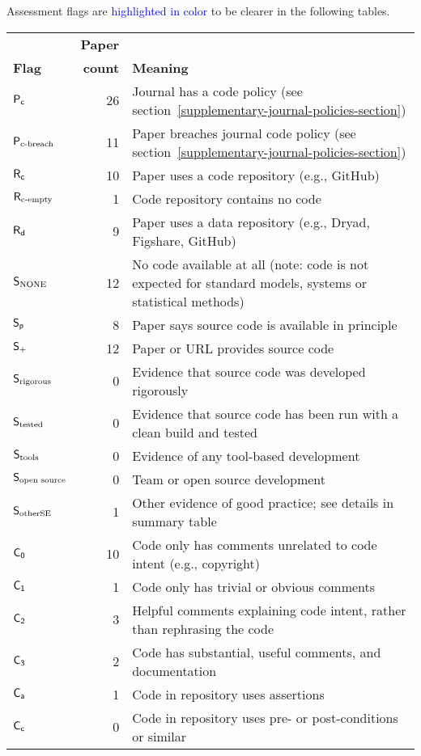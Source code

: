 \documentclass[10pt,a4paper]{article}
\begin{document}
\def\flagStyle#1{\textcolor{blue}{\sf #1}}

\noindent
Assessment flags are \flagStyle{highlighted in color} to be clearer in the following tables.\\

\noindent
\begin{center}
\sf
\begin{tabular}{lrp{4.5in}}
&\bfseries{Paper}&\\\bfseries{Flag}&\bfseries{count}&\bfseries{Meaning}\\ \hline 
\flagStyle{$\sf P_c$}&26&Journal has a code policy (see section~\ref{supplementary-journal-policies-section})\\ 
\flagStyle{$\sf P_{{\mbox{\scriptsize c-breach}}}$}&11&Paper breaches journal code policy (see section~\ref{supplementary-journal-policies-section})\\ 
\flagStyle{$\sf R_c$}&10&Paper uses a code repository (e.g., GitHub)\\ 
\flagStyle{$\sf R_{\mbox{\scriptsize c-empty}}$}&1&Code repository contains no code\\ 
\flagStyle{$\sf R_d$}&9&Paper uses a data repository (e.g., Dryad, Figshare, GitHub)\\ 
\flagStyle{$\sf S_{\mbox{\scriptsize NONE}}$}&12&No code available at all (note: code is not expected for standard models, systems or statistical methods)\\ 
\flagStyle{$\sf S_p$}&8&Paper says source code is available in principle\\ 
\flagStyle{$\sf S_{+}$}&12&Paper or URL provides source code\\ 
\flagStyle{$\sf S_{{\mbox{\scriptsize rigorous}}}$}&0&Evidence that source code was developed rigorously\\ 
\flagStyle{$\sf S_{\mbox{\scriptsize tested}}$}&0&Evidence that source code has been run with a clean build and tested\\ 
\flagStyle{$\sf S_{{\mbox{\scriptsize tools}}}$}&0&Evidence of any tool-based development\\ 
\flagStyle{$\sf S_{{\mbox{\scriptsize open source}}}$}&0&Team or open source development\\ 
\flagStyle{$\sf S_{{\mbox{\scriptsize otherSE}}}$}&1&Other evidence of good practice; see details in summary table\\ 
\flagStyle{$\sf C_0$}&10&Code only has comments unrelated to code intent (e.g., copyright)\\ 
\flagStyle{$\sf C_1$}&1&Code only has trivial or obvious comments\\ 
\flagStyle{$\sf C_2$}&3&Helpful comments explaining code intent, rather than rephrasing the code\\ 
\flagStyle{$\sf C_3$}&2&Code has substantial, useful comments, and documentation\\ 
\flagStyle{$\sf C_a$}&1&Code in repository uses assertions\\ 
\flagStyle{$\sf C_c$}&0&Code in repository uses pre- or post-conditions or similar\\ 
\end{tabular}
\end{center}
\end{document}
